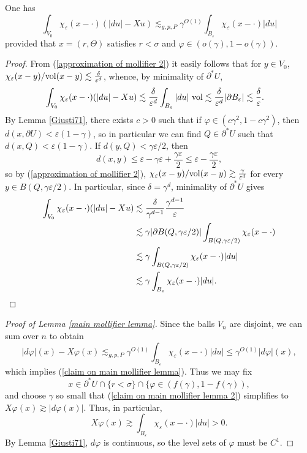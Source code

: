 \begin{sublemma}
One has
$$\int_{V_0} \chi_\varepsilon(x - \cdot)(|du| - Xu) \lesssim_{g, p, P} \gamma^{O(1)} \int_{B_\varepsilon} \chi_\varepsilon(x - \cdot)|du|$$
provided that $x = (r, \Theta)$ satisfies $r < \sigma$ and $\varphi \in (o(\gamma), 1 - o(\gamma))$.
\end{sublemma}
\begin{proof}
From (\ref{approximation of mollifier 2}) it easily follows that for $y \in V_0$, $\chi_\varepsilon(x - y)/\mathrm{vol}(x - y) \lesssim \frac{\delta}{\varepsilon^d}$,
whence, by minimality of $\partial^* U$,
\begin{align*}
\int_{V_0} \chi_\varepsilon(x - \cdot)(|du| - Xu) &\lesssim \frac{\delta}{\varepsilon^d} \int_{B_\varepsilon} |du| ~\mathrm{vol} \lesssim \frac{\delta}{\varepsilon^d} |\partial B_\varepsilon| \lesssim \frac{\delta}{\varepsilon}.
\end{align*}
By Lemma \ref{Giusti71}, there exists $c > 0$ such that if $\varphi \in (c\gamma^2, 1 - c\gamma^2)$, then $d(x, \partial U) < \varepsilon(1 - \gamma)$, so in particular we can find $Q \in \partial^* U$ such that $d(x, Q) < \varepsilon(1 - \gamma)$.
If $d(y, Q) < \gamma\varepsilon/2$, then
$$d(x, y) \leq \varepsilon - \gamma\varepsilon + \frac{\gamma\varepsilon}{2} \leq \varepsilon - \frac{\gamma\varepsilon}{2},$$
so by (\ref{approximation of mollifier 2}), $\chi_\varepsilon(x - y)/\mathrm{vol}(x - y) \gtrsim \frac{\gamma}{\varepsilon^d}$
for every $y \in B(Q, \gamma\varepsilon/2)$.
In particular, since $\delta = \gamma^d$, minimality of $\partial^* U$ gives
\begin{align*}
\int_{V_0} \chi_\varepsilon(x - \cdot)(|du| - Xu) &\lesssim \frac{\delta}{\gamma^{d - 1}} \frac{\gamma^{d - 1}}{\varepsilon}\\
&\lesssim \gamma |\partial B(Q, \gamma\varepsilon/2)| \int_{B(Q, \gamma\varepsilon/2)} \chi_\varepsilon(x - \cdot) \\
&\lesssim \gamma \int_{B(Q, \gamma\varepsilon/2)} \chi_\varepsilon(x - \cdot) |du|\\
&\lesssim \gamma \int_{B_\varepsilon} \chi_\varepsilon(x - \cdot) |du|. \qedhere
\end{align*}
\end{proof}

\begin{proof}[Proof of Lemma \ref{main mollifier lemma}]
Since the balls $V_n$ are disjoint, we can sum over $n$ to obtain
\begin{equation}\label{claim on main mollifier lemma 2}|d\varphi|(x) - X\varphi(x) \lesssim_{g, p, P} \gamma^{O(1)} \int_{B_\varepsilon} \chi_\varepsilon(x - \cdot)|du| \leq \gamma^{O(1)} |d\varphi|(x),
\end{equation}
which implies (\ref{claim on main mollifier lemma}). Thus we may fix
$$x \in \partial^* U \cap \{r < \sigma\} \cap \{\varphi \in (f(\gamma), 1 - f(\gamma)),$$
and choose $\gamma$ so small that (\ref{claim on main mollifier lemma 2}) simplifies to $X\varphi(x) \gtrsim |d\varphi(x)|$.
Thus, in particular,
$$X\varphi(x) \gtrsim \int_{B_\varepsilon} \chi_\varepsilon(x - \cdot) |du| > 0.$$
By Lemma \ref{Giusti71}, $d\varphi$ is continuous, so the level sets of $\varphi$ must be $C^1$.
\end{proof}

